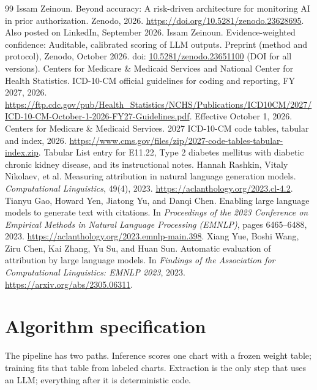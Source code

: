 \documentclass[10pt,letterpaper]{article}
\begin{document}
\begin{thebibliography}{99}
 Issam Zeinoun. Beyond accuracy: A risk-driven architecture for monitoring AI in prior authorization. Zenodo, 2026. \url{https://doi.org/10.5281/zenodo.23628695}. Also posted on LinkedIn, September 2026.
 Issam Zeinoun. Evidence-weighted confidence: Auditable, calibrated scoring of LLM outputs. Preprint (method and protocol), Zenodo, October 2026. doi: \href{https://doi.org/10.5281/zenodo.23651100}{10.5281/zenodo.23651100} (DOI for all versions).
 Centers for Medicare \& Medicaid Services and National Center for Health Statistics. ICD-10-CM official guidelines for coding and reporting, FY 2027, 2026. \url{https://ftp.cdc.gov/pub/Health_Statistics/NCHS/Publications/ICD10CM/2027/ICD-10-CM-October-1-2026-FY27-Guidelines.pdf}. Effective October 1, 2026.
 Centers for Medicare \& Medicaid Services. 2027 ICD-10-CM code tables, tabular and index, 2026. \url{https://www.cms.gov/files/zip/2027-code-tables-tabular-index.zip}. Tabular List entry for E11.22, Type 2 diabetes mellitus with diabetic chronic kidney disease, and its instructional notes.
 Hannah Rashkin, Vitaly Nikolaev, et al. Measuring attribution in natural language generation models. \emph{Computational Linguistics}, 49(4), 2023. \url{https://aclanthology.org/2023.cl-4.2}.
 Tianyu Gao, Howard Yen, Jiatong Yu, and Danqi Chen. Enabling large language models to generate text with citations. In \emph{Proceedings of the 2023 Conference on Empirical Methods in Natural Language Processing (EMNLP)}, pages 6465--6488, 2023. \url{https://aclanthology.org/2023.emnlp-main.398}.
 Xiang Yue, Boshi Wang, Ziru Chen, Kai Zhang, Yu Su, and Huan Sun. Automatic evaluation of attribution by large language models. In \emph{Findings of the Association for Computational Linguistics: EMNLP 2023}, 2023. \url{https://arxiv.org/abs/2305.06311}.
\end{thebibliography}

\appendix
\section{Algorithm specification}\label{app:algo}

The pipeline has two paths. Inference scores one chart with a frozen weight table; training fits that table from labeled charts. Extraction is the only step that uses an LLM; everything after it is deterministic code.
\end{document}
